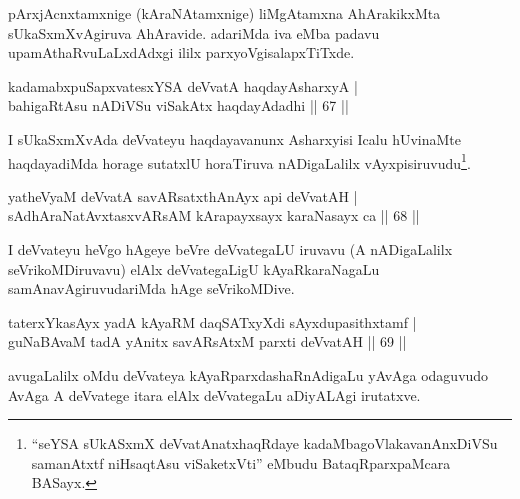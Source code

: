 \begin{artha}
pArxjAcnxtamxnige (kAraNAtamxnige) liMgAtamxna AhArakikxMta sUkaSxmXvAgiruva AhAravide. adariMda iva eMba padavu upamAthaRvuLaLxdAdxgi ililx parxyoVgisalapxTiTxde.
\end{artha}


\begin{shl}
kadamabxpuSapxvatesxYSA deVvatA haqdayAsharxyA |\\
bahigaRtAsu nADiVSu viSakAtx haqdayAdadhi \hfill || 67 || 
\end{shl}

\begin{artha}
I sUkaSxmXvAda deVvateyu haqdayavanunx Asharxyisi Icalu hUvinaMte haqdayadiMda horage sutatxlU horaTiruva nADigaLalilx vAyxpisiruvudu\footnote{``seYSA sUkASxmX deVvatA\s natxhaqRdaye kadaMbagoVlakavanAnxDiVSu samanAtxtf niHsaqtAsu viSaketxVti'' eMbudu BataqRparxpaMcara BASayx.}.
\end{artha}

\begin{shl}
\footnotemark[2]yatheVyaM \footnotemark[3]deVvatA savARsatxthA\s nAyx api deVvatAH |\\
sAdhAraNatAvxtasxvARsAM kArapayxsayx karaNasayx ca \hfill || 68 || 
\end{shl}

\begin{artha}
 I deVvateyu heVgo hAgeye beVre deVvategaLU iruvavu (A nADigaLalilx seVrikoMDiruvavu) elAlx deVvategaLigU kAyaRkaraNagaLu samAnavAgiruvudariMda hAge seVrikoMDive.
\end{artha}

\begin{shl}
taterxYkasAyx yadA kAyaRM daqSATxyXdi sAyxdupasithxtamf |\\
guNaBAvaM tadA yAnitx savARsAtxM parxti deVvatAH \hfill || 69 || 
\end{shl}

\begin{artha}
avugaLalilx oMdu deVvateya kAyaRparxdashaRnAdigaLu yAvAga odaguvudo AvAga A deVvatege itara elAlx deVvategaLu aDiyALAgi irutatxve.
\end{artha}

